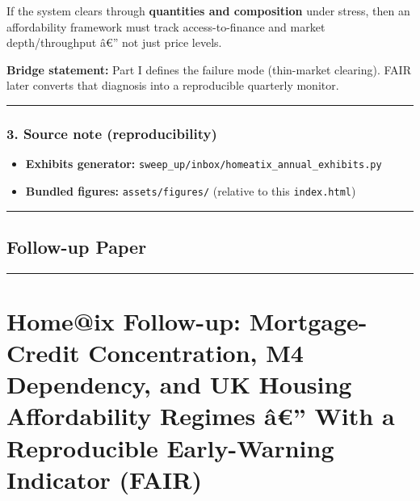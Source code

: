 If the system clears through \textbf{quantities and composition} under
stress, then an affordability framework must track access-to-finance and
market depth/throughput â€'' not just price levels.

\textbf{Bridge statement:} Part I defines the failure mode (thin-market
clearing). FAIR later converts that diagnosis into a reproducible
quarterly monitor.

\begin{center}\rule{0.5\linewidth}{0.5pt}\end{center}

\protect{}\label{part1-source-note}
\subsubsection{3. Source note
(reproducibility)}\label{source-note-reproducibility}

\begin{itemize}
\tightlist
\item
  \textbf{Exhibits generator:}
  \texttt{sweep\_up/inbox/homeatix\_annual\_exhibits.py}
\item
  \textbf{Bundled figures:} \texttt{assets/figures/} (relative to this
  \texttt{index.html})
\end{itemize}

\begin{center}\rule{0.5\linewidth}{0.5pt}\end{center}

\protect{}\label{followup}
\subsection{Follow-up Paper}\label{follow-up-paper}

\begin{center}\rule{0.5\linewidth}{0.5pt}\end{center}

\section{\texorpdfstring{\textbf{Home@ix Follow-up:} Mortgage-Credit
Concentration, M4 Dependency, and UK Housing Affordability Regimes â€''
With a Reproducible Early-Warning Indicator
(FAIR)}{Home@ix Follow-up: Mortgage-Credit Concentration, M4 Dependency, and UK Housing Affordability Regimes â€'' With a Reproducible Early-Warning Indicator (FAIR)}}\label{homeix-follow-up-mortgage-credit-concentration-m4-dependency-and-uk-housing-affordability-regimes-uxe2-with-a-reproducible-early-warning-indicator-fair}

